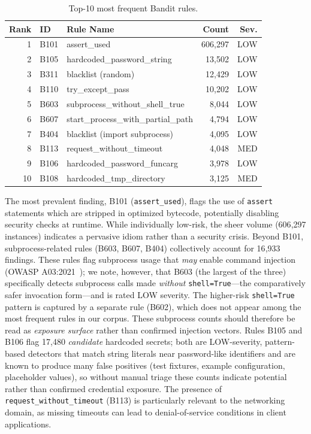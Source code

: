 \documentclass[sigconf,authordraft]{acmart}
\begin{document}
\begin{table}[h]
  \caption{Top-10 most frequent Bandit rules.}
  \label{tab:top-rules}
  \begin{tabular}{rllrr}
    \toprule
    Rank & ID & Rule Name & Count & Sev. \\
    \midrule
    1  & B101 & assert\_used                        & 606{,}297 & LOW \\
    2  & B105 & hardcoded\_password\_string          &  13{,}502 & LOW \\
    3  & B311 & blacklist (random)                   &  12{,}429 & LOW \\
    4  & B110 & try\_except\_pass                    &  10{,}202 & LOW \\
    5  & B603 & subprocess\_without\_shell\_true     &   8{,}044 & LOW \\
    6  & B607 & start\_process\_with\_partial\_path  &   4{,}794 & LOW \\
    7  & B404 & blacklist (import subprocess)        &   4{,}095 & LOW \\
    8  & B113 & request\_without\_timeout            &   4{,}048 & MED \\
    9  & B106 & hardcoded\_password\_funcarg         &   3{,}978 & LOW \\
    10 & B108 & hardcoded\_tmp\_directory            &   3{,}125 & MED \\
    \bottomrule
  \end{tabular}
\end{table}

The most prevalent finding, B101 (\texttt{assert\_used}), flags the use
of \texttt{assert} statements which are stripped in optimized bytecode,
potentially disabling security checks at runtime. While individually
low-risk, the sheer volume (606{,}297 instances) indicates a
pervasive idiom rather than a security crisis. Beyond B101,
subprocess-related rules (B603, B607, B404) collectively account for
16{,}933 findings. These rules flag subprocess usage that \emph{may}
enable command injection (OWASP A03:2021~\cite{OWASP2021}); we note,
however, that B603 (the largest of the three) specifically detects
subprocess calls made \emph{without} \texttt{shell=True}---the
comparatively safer invocation form---and is rated LOW severity. The
higher-risk \texttt{shell=True} pattern is captured by a separate rule
(B602), which does not appear among the most frequent rules in our
corpus. These subprocess counts should therefore be read as
\emph{exposure surface} rather than confirmed injection vectors.
Rules B105 and B106 flag 17{,}480 \emph{candidate} hardcoded secrets;
both are LOW-severity, pattern-based detectors that match string
literals near password-like identifiers and are known to produce many
false positives (test fixtures, example configuration, placeholder
values), so without manual triage these counts indicate potential
rather than confirmed credential exposure. The presence of
\texttt{request\_without\_timeout} (B113) is particularly relevant to
the networking domain, as missing timeouts can lead to denial-of-service
conditions in client applications.
\end{document}
